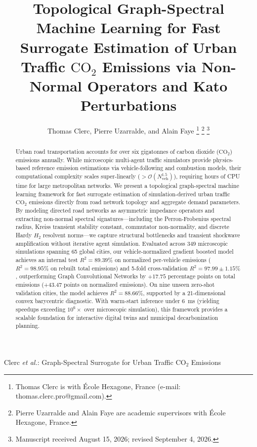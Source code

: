 \documentclass[journal]{IEEEtran}
\begin{document}
\title{Topological Graph-Spectral Machine Learning for Fast Surrogate Estimation of Urban Traffic $\text{CO}_2$ Emissions via Non-Normal Operators and Kato Perturbations}

\author{Thomas Clerc, Pierre Uzarralde, and Alain Faye
\thanks{Thomas Clerc is with \'Ecole Hexagone, France (e-mail: thomas.clerc.pro@gmail.com).}%
\thanks{Pierre Uzarralde and Alain Faye are academic supervisors with \'Ecole Hexagone, France.}%
\thanks{Manuscript received August 15, 2026; revised September 4, 2026.}}

%
{Clerc \MakeLowercase{\textit{et al.}}: Graph-Spectral Surrogate for Urban Traffic $\text{CO}_2$ Emissions}

\maketitle

\begin{abstract}
Urban road transportation accounts for over six gigatonnes of carbon dioxide ($\text{CO}_2$) emissions annually. While microscopic multi-agent traffic simulators provide physics-based reference emission estimations via vehicle-following and combustion models, their computational complexity scales super-linearly ($>\mathcal{O}(N_{\text{veh}}^{1.5})$), requiring hours of CPU time for large metropolitan networks. We present a topological graph-spectral machine learning framework for fast surrogate estimation of simulation-derived urban traffic $\text{CO}_2$ emissions directly from road network topology and aggregate demand parameters. By modeling directed road networks as asymmetric impedance operators and extracting non-normal spectral signatures---including the Perron-Frobenius spectral radius, Kreiss transient stability constant, commutator non-normality, and discrete Hardy $H_2$ resolvent norms---we capture structural bottlenecks and transient shockwave amplification without iterative agent simulation. Evaluated across 349 microscopic simulations spanning 65 global cities, our vehicle-normalized gradient boosted model achieves an internal test $R^2 = 89.39\%$ on normalized per-vehicle emissions ($R^2 = 98.95\%$ on rebuilt total emissions) and 5-fold cross-validation $R^2 = 97.99 \pm 1.15\%$, outperforming Graph Convolutional Networks by $+17.75$ percentage points on total emissions (+43.47 points on normalized emissions). On nine unseen zero-shot validation cities, the model achieves $R^2 = 88.66\%$, supported by a 21-dimensional convex barycentric diagnostic. With warm-start inference under 6~ms (yielding speedups exceeding $10^6\times$ over microscopic simulation), this framework provides a scalable foundation for interactive digital twins and municipal decarbonization planning.
\end{abstract}
\end{document}
